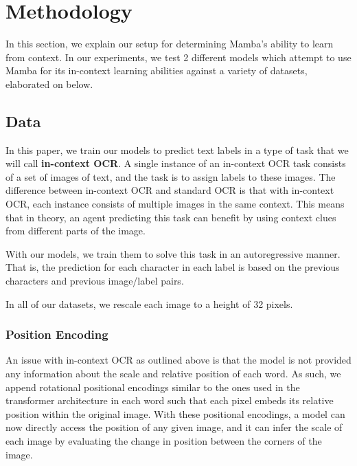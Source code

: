 \section{Methodology}
In this section, we explain our setup for determining Mamba's ability to learn
from context.
In our experiments, we test 2 different models which attempt to use Mamba for its
in-context learning abilities against a variety of datasets, elaborated on
below.

\subsection{Data}
In this paper, we train our models to predict text labels in a type of task that
we will call \textbf{in-context OCR}.
A single instance of an in-context OCR task consists of a set of images of text,
and the task is to assign labels to these images.
The difference between in-context OCR and standard OCR is that with in-context
OCR, each instance consists of multiple images in the same context.
This means that in theory, an agent predicting this task can benefit by
using context clues from different parts of the image.

With our models, we train them to solve this task in an autoregressive manner.
That is, the prediction for each character in each label is based on the
previous characters and previous image/label pairs.

In all of our datasets, we rescale each image to a height of 32 pixels.

\subsubsection{Position Encoding}
An issue with in-context OCR as outlined above is that the model is not
provided any information about the scale and relative position of each word.
As such, we append rotational positional encodings similar to the ones used in
the transformer architecture\cite{attention} in each word such that each
pixel embeds its relative position within the original image.
With these positional encodings, a model can now directly access the position of
any given image, and it can infer the scale of each image by evaluating the
change in position between the corners of the image.

